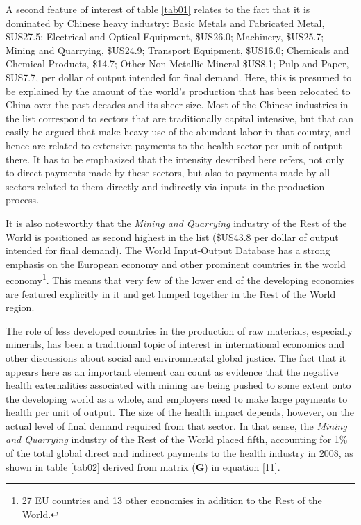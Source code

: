 \documentclass[a4paper,12pt, ]{article}
\begin{document}
A second feature of interest of table \ref{tab01} relates to the fact that it is dominated by Chinese heavy industry: Basic Metals and Fabricated Metal, \$US27.5; Electrical and Optical Equipment, \$US26.0; Machinery, \$US25.7; Mining and Quarrying, \$US24.9; Transport Equipment, \$US16.0; Chemicals and Chemical Products, \$14.7; Other Non-Metallic Mineral \$US8.1; Pulp and Paper, \$US7.7, per dollar of output intended for final demand. Here, this is presumed to be explained by the amount of the world's production that has been relocated to China over the past decades and its sheer size. Most of the Chinese industries in the list correspond to sectors that are traditionally capital intensive, but that can easily be argued that make heavy use of the abundant labor in that country, and hence are related to extensive payments to the health sector per unit of output there. It has to be emphasized that the intensity described here refers, not only to direct payments made by these sectors, but also to payments made by all sectors related to them directly and indirectly via inputs in the production process. 

It is also noteworthy that the \textit{Mining and Quarrying} industry of the Rest of the World is positioned as second highest in the list (\$US43.8 per dollar of output intended for final demand). 
The World Input-Output Database has a strong emphasis on the European economy and other prominent countries in the world economy\footnote{27 EU countries and 13 other economies in addition to the Rest of the World.}. This means that very few of the lower end of the developing economies are featured explicitly in it and get lumped together in the Rest of the World region.

The role of less developed countries in the production of raw materials, especially minerals, has been a traditional topic of interest in international economics and other discussions about social and environmental global justice. The fact that it appears here as an important element can count as evidence that the negative health externalities associated with mining are being pushed to some extent onto the developing world as a whole, and employers need to make large payments to health per unit of output. The size of the health impact depends, however, on the actual level of final demand required from that sector. In that sense, the \textit{Mining and Quarrying} industry of the Rest of the World placed fifth, accounting for 1\% of the total global direct and indirect payments to the health industry in 2008, as shown in table \ref{tab02} derived from matrix ($\mathbf{G}$) in equation \ref{11}.
\end{document}
